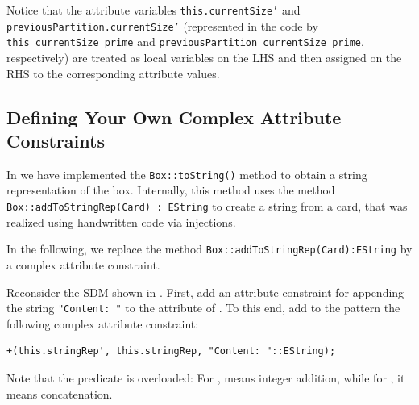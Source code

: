 Notice that the attribute variables \texttt{this.currentSize'} and \\
\texttt{previousPartition.currentSize'} (represented in the code by \\ 
\texttt{this\_currentSize\_prime} and \texttt{previousPartition\_currentSize\_prime}, respectively) are treated as local variables on the LHS and then assigned on the RHS to the corresponding attribute values.

\subsection{Defining Your Own Complex Attribute Constraints}  
In  we have implemented the \texttt{Box::toString()} method to obtain a string representation of the box. 
Internally, this method uses the method \texttt{Box::addToStringRep(Card) : EString} to create a string from a card, that was realized using handwritten code via injections.

In the following, we replace the method \texttt{Box::addToStringRep(Card):EString} by a complex attribute constraint.

\begin{stepbystep}
\item 
Reconsider the SDM shown in .
First, add an attribute constraint for appending the string \texttt{"Content: "} to the  attribute of .
To this end, add to the  pattern the following complex attribute constraint:
\begin{verbatim}
+(this.stringRep', this.stringRep, "Content: "::EString);
\end{verbatim}
\end{stepbystep}  
Note that the predicate \entity{+} is overloaded: For , \entity{+} means integer addition, while for , it means concatenation.
   	  


